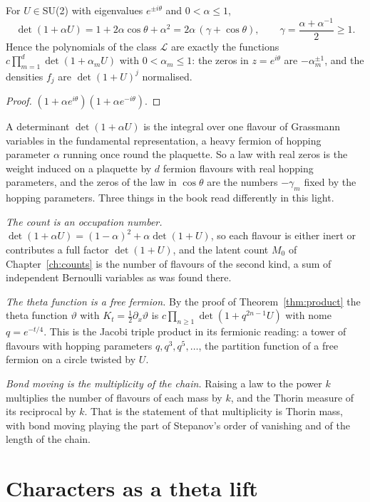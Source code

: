 \begin{proposition}\label{prop:determinant}
For $U\in{}$SU(2) with eigenvalues $e^{\pm i\theta}$ and $0<\alpha\le1$,
\[
\det(1+\alpha U)=1+2\alpha\cos\theta+\alpha^2=2\alpha\,(\gamma+\cos\theta),\qquad\gamma=\frac{\alpha+\alpha^{-1}}2\ge1 .
\]
Hence the polynomials of the class $\mathcal L$ are exactly the functions $c\prod_{m=1}^d\det(1+\alpha_mU)$ with $0<\alpha_m\le1$: the zeros in $z=e^{i\theta}$ are $-\alpha_m^{\pm1}$, and the densities $f_j$ are $\det(1+U)^j$ normalised.
\end{proposition}

\begin{proof}
$(1+\alpha e^{i\theta})(1+\alpha e^{-i\theta})$.
\end{proof}

A determinant $\det(1+\alpha U)$ is the integral over one flavour of Grassmann variables in the fundamental representation, a heavy fermion of hopping parameter $\alpha$ running once round the plaquette. So a law with real zeros is the weight induced on a plaquette by $d$ fermion flavours with real hopping parameters, and the zeros of the law in $\cos\theta$ are the numbers $-\gamma_m$ fixed by the hopping parameters. Three things in the book read differently in this light.

\emph{The count is an occupation number.} $\det(1+\alpha U)=(1-\alpha)^2+\alpha\det(1+U)$, so each flavour is either inert or contributes a full factor $\det(1+U)$, and the latent count $M_0$ of Chapter~\ref{ch:counts} is the number of flavours of the second kind, a sum of independent Bernoulli variables as was found there.

\emph{The theta function is a free fermion.} By the proof of Theorem~\ref{thm:product} the theta function $\vartheta$ with $K_t=\frac12\partial_x\vartheta$ is $c\prod_{n\ge1}\det(1+q^{2n-1}U)$ with nome $q=e^{-t/4}$. This is the Jacobi triple product in its fermionic reading: a tower of flavours with hopping parameters $q,q^3,q^5,\dots$, the partition function of a free fermion on a circle twisted by $U$.

\emph{Bond moving is the multiplicity of the chain.} Raising a law to the power $k$ multiplies the number of flavours of each mass by $k$, and the Thorin measure of its reciprocal by $k$. That is the statement of \cite{PS26t} that multiplicity is Thorin mass, with bond moving playing the part of Stepanov's order of vanishing and of the length of the chain.

\section{Characters as a theta lift}\label{sec:t11howe}

